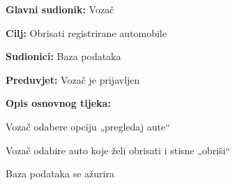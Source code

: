 					\noindent {}
					\begin{packed_item}
						
						\item  \textbf{Glavni sudionik: } Vozač
						\item  \textbf{Cilj:} Obrisati registrirane automobile
						\item  \textbf{Sudionici:} Baza podataka
						\item  \textbf{Preduvjet:} Vozač je prijavljen
						\item  \textbf{Opis osnovnog tijeka:}
						
						\item[] \begin{packed_enum}
							\item Vozač odabere opciju „pregledaj aute“
							\item Vozač odabire auto koje želi obrisati i stisne  „obriši“
							\item Baza podataka se ažurira
						\end{packed_enum}
					\end{packed_item}
					\noindent {}
